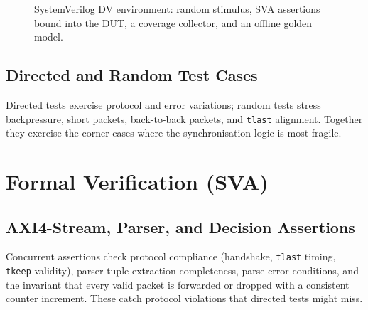 \documentclass[12pt,twoside,openright]{book}
\begin{document}
\begin{figure}[H]
\centering
\footnotesize
{}
\caption{SystemVerilog DV environment: random stimulus, SVA assertions bound into the DUT, a coverage
collector, and an offline golden model.}
\label{fig:dv}
\end{figure}

\subsection{Directed and Random Test Cases}

Directed tests exercise protocol and error variations; random tests stress backpressure, short
packets, back-to-back packets, and \texttt{tlast} alignment. Together they exercise the corner
cases where the synchronisation logic is most fragile.

\section{Formal Verification (SVA)}

\subsection{AXI4-Stream, Parser, and Decision Assertions}

Concurrent assertions check protocol compliance (handshake, \texttt{tlast} timing, \texttt{tkeep}
validity), parser tuple-extraction completeness, parse-error conditions, and the invariant that
every valid packet is forwarded or dropped with a consistent counter increment. These catch
protocol violations that directed tests might miss.
\end{document}
